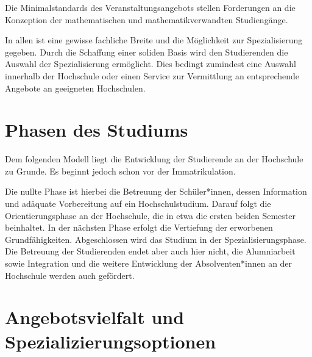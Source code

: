 Die Minimalstandards des Veranstaltungsangebots stellen Forderungen an die Konzeption der mathematischen und mathematikverwandten Studiengänge.

In allen ist eine gewisse fachliche Breite und die Möglichkeit zur Spezialisierung gegeben. Durch die Schaffung einer soliden Basis wird den Studierenden die Auswahl der Spezialisierung ermöglicht. Dies bedingt zumindest eine Auswahl innerhalb der Hochschule oder einen Service zur Vermittlung an entsprechende Angebote an geeigneten Hochschulen.

\section{Phasen des Studiums}

Dem folgenden Modell liegt die Entwicklung der Studierende an der Hochschule zu Grunde. Es beginnt jedoch schon vor der Immatrikulation.

Die \glqq{}nullte\grqq{} Phase ist hierbei die Betreuung der Schüler*innen, dessen Information und adäquate Vorbereitung auf ein Hochschulstudium. Darauf folgt die Orientierungsphase an der Hochschule, die in etwa die ersten beiden Semester beinhaltet. In der nächsten Phase erfolgt die Vertiefung der erworbenen Grundfähigkeiten. Abgeschlossen wird das Studium in der Spezialisierungsphase. Die Betreuung der Studierenden endet aber auch hier nicht, die Alumniarbeit sowie Integration und die weitere Entwicklung der Absolventen*innen an der Hochschule werden auch gefördert.

\begin{figure}[h!]
  \centering
\end{figure}

\section{Angebotsvielfalt und Spezializierungsoptionen}

